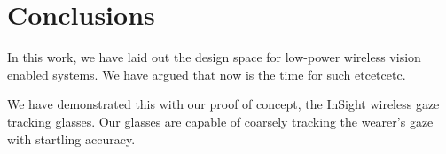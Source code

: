 \section{Conclusions}
\label{sec:conc}

In this work, we have laid out the design space for low-power wireless vision enabled systems.  We have argued that now is the time for such etcetcetc.

We have demonstrated this with our proof of concept, the InSight wireless gaze tracking glasses.  Our glasses are capable of coarsely tracking the wearer's gaze with startling accuracy.
